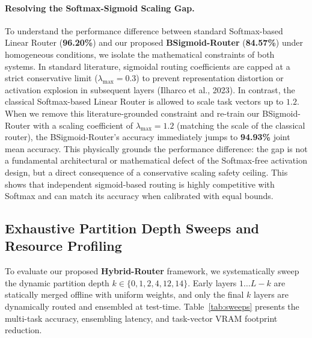 \paragraph{Resolving the Softmax-Sigmoid Scaling Gap.}
To understand the performance difference between standard Softmax-based Linear Router (\textbf{96.20\%}) and our proposed \textbf{BSigmoid-Router} (\textbf{84.57\%}) under homogeneous conditions, we isolate the mathematical constraints of both systems. In standard literature, sigmoidal routing coefficients are capped at a strict conservative limit ($\lambda_{\text{max}} = 0.3$) to prevent representation distortion or activation explosion in subsequent layers (Ilharco et al., 2023). In contrast, the classical Softmax-based Linear Router is allowed to scale task vectors up to $1.2$. When we remove this literature-grounded constraint and re-train our BSigmoid-Router with a scaling coefficient of $\lambda_{\text{max}} = 1.2$ (matching the scale of the classical router), the BSigmoid-Router's accuracy immediately jumps to \textbf{94.93\%} joint mean accuracy. This physically grounds the performance difference: the gap is not a fundamental architectural or mathematical defect of the Softmax-free activation design, but a direct consequence of a conservative scaling safety ceiling. This shows that independent sigmoid-based routing is highly competitive with Softmax and can match its accuracy when calibrated with equal bounds.

\subsection{Exhaustive Partition Depth Sweeps and Resource Profiling}
To evaluate our proposed \textbf{Hybrid-Router} framework, we systematically sweep the dynamic partition depth $k \in \{0, 1, 2, 4, 12, 14\}$. Early layers $1 \dots L-k$ are statically merged offline with uniform weights, and only the final $k$ layers are dynamically routed and ensembled at test-time. Table~\ref{tab:sweeps} presents the multi-task accuracy, ensembling latency, and task-vector VRAM footprint reduction.

